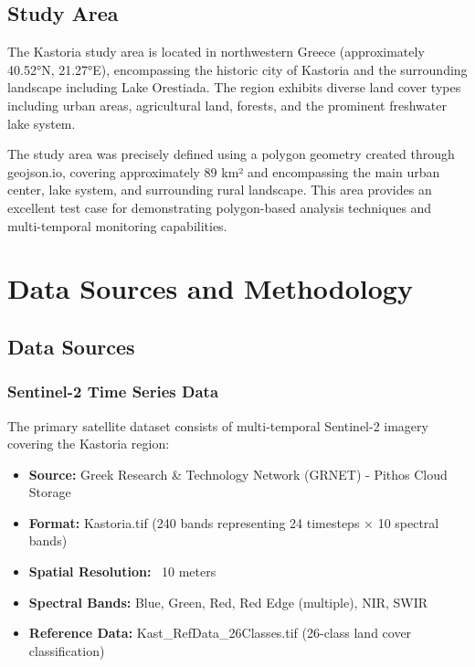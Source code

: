 \documentclass[a4paper,12pt]{article}
\begin{document}
\subsection{Study Area}

The Kastoria study area is located in northwestern Greece (approximately
40.52°N, 21.27°E), encompassing the historic city of Kastoria and the
surrounding landscape including Lake Orestiada. The region exhibits diverse
land cover types including urban areas, agricultural land, forests, and the
prominent freshwater lake system.

The study area was precisely defined using a polygon geometry created through
geojson.io, covering approximately 89 km² and encompassing the main urban
center, lake system, and surrounding rural landscape. This area provides an
excellent test case for demonstrating polygon-based analysis techniques and
multi-temporal monitoring capabilities.

\section{Data Sources and Methodology}

\subsection{Data Sources}

\subsubsection{Sentinel-2 Time Series Data}

The primary satellite dataset consists of multi-temporal Sentinel-2 imagery
covering the Kastoria region:

\begin{itemize}
    \item \textbf{Source:} Greek Research \& Technology Network (GRNET) - Pithos Cloud Storage
    \item \textbf{Format:} Kastoria.tif (240 bands representing 24 timesteps × 10 spectral bands)
    \item \textbf{Spatial Resolution:} ~10 meters
    \item \textbf{Spectral Bands:} Blue, Green, Red, Red Edge (multiple), NIR, SWIR
    \item \textbf{Reference Data:} Kast\_RefData\_26Classes.tif (26-class land cover classification)
\end{itemize}
\end{document}
